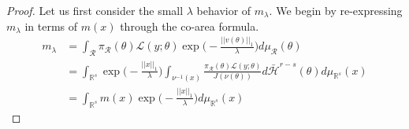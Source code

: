 \documentclass[10pt,fleqn]{article}
\DeclareMathOperator{\1}{\mathbbm{1}}
\begin{document}
{\begin{proof}
%
%
%
%
%
Let us first consider the small $\lambda$ behavior of $m_\lambda.$ We begin by re-expressing $m_\lambda$ in terms of $m(x)$ through the co-area formula.
\begin{align*}
m_\lambda &= \int_\mathcal{R} \pi_\mathcal{R}(\theta) \mathcal{L}(y;\theta) \exp\bigg(-\frac{||v(\theta)||_1}{\lambda}\bigg) d\mu_\mathcal{R}(\theta) \\
&= \int_{\mathbb{R}^s} \exp\bigg(-\frac{||x||_1}{\lambda}\bigg) \int_{\nu^{-1}(x)} \frac{\pi_\mathcal{R}(\theta) \mathcal{L}(y;\theta)}{J(\nu(\theta))} d\bar{\mathcal{H}}^{r-s}(\theta) d\mu_{\mathbb{R}^s} (x) \\
&=\int_{\mathbb{R}^s}m(x) \exp\bigg(-\frac{||x||_1}{\lambda}\bigg)d\mu_{\mathbb{R}^s}(x)
\end{align*}


\end{proof}}
\end{document}
